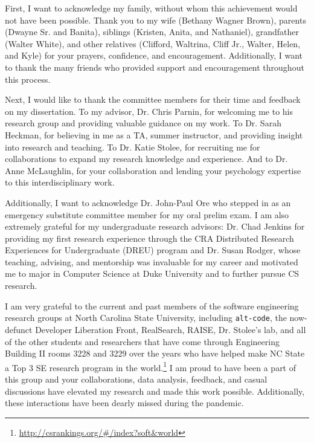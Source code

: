 \begin{acknowledgements}

First, I want to acknowledge my family, without whom this achievement would not have been possible. Thank you to my wife (Bethany Wagner Brown), parents (Dwayne Sr. and Banita), siblings (Kristen, Anita, and Nathaniel), grandfather (Walter White), and other relatives (Clifford, Waltrina, Cliff Jr., Walter, Helen, and Kyle) for your prayers, confidence, and encouragement. Additionally, I want to thank the many friends who provided support and encouragement throughout this process.

Next, I would like to thank the committee members for their time and feedback on my dissertation. To my advisor, Dr. Chris Parnin, for welcoming me to his research group and providing valuable guidance on my work. To Dr. Sarah Heckman, for believing in me as a TA, summer instructor, and providing insight into research and teaching. To Dr. Katie Stolee, for recruiting me for collaborations to expand my research knowledge and experience. And to Dr. Anne  McLaughlin, for your collaboration and lending your psychology expertise to this interdisciplinary work. 

Additionally, I want to acknowledge Dr. John-Paul Ore who stepped in as an emergency substitute committee member for my oral prelim exam. I am also extremely grateful for my undergraduate research advisors: Dr. Chad Jenkins for providing my first research experience through the CRA Distributed Research Experiences for Undergraduate (DREU) program and Dr. Susan Rodger, whose teaching, advising, and mentorship was invaluable for my career and motivated me to major in Computer Science at Duke University and to further pursue CS research.

I am very grateful to the current and past members of the software engineering research groups at North Carolina State University, including \texttt{alt-code}, the now-defunct Developer Liberation Front, RealSearch, RAISE, Dr. Stolee's lab, and all of the other students and researchers that have come through Engineering Building II rooms 3228 and 3229 over the years who have helped make NC State a Top 3 SE research program in the world.\footnote{\url{http://csrankings.org/\#/index?soft&world}} I am proud to have been a part of this group and your collaborations, data analysis, feedback, and casual discussions have elevated my research and made this work possible.  Additionally, these interactions have been dearly missed during the pandemic. 


\end{acknowledgements}
